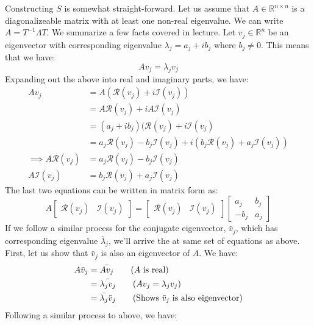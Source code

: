\documentclass[12pt]{exam}
\newcommand{\Q}[1]{\question{\large{\textbf{#1}}}}
\begin{document}
\begin{questions}
  \newpage
  \Q{Real modal form}
  \begin{solution}
    Constructing $S$ is somewhat straight-forward. Let us assume that $A \in \mathbb{R}^{n\times n}$ is a diagonalizeable matrix with at least one non-real eigenvalue. We can write $A = T^{-1}\Lambda T$. We summarize a few facts covered in lecture. Let $v_j \in \mathbb{R}^n$ be an eigenvector with corresponding eigenvalue $\lambda_j = a_j + i b_j$ where $b_j \neq 0$. This means that we have:
    \[
      Av_j = \lambda_j v_j
    \]
    Expanding out the above into real and imaginary parts, we have:
    \begin{align*}
      Av_j &= A(\mathcal{R}(v_j) + i \mathcal{I}(v_j)) \\
      &= A\mathcal{R}(v_j) + i A \mathcal{I}(v_j) \\
      &= (a_j + ib_j)(\mathcal{R}(v_j) + i \mathcal{I}(v_j) \\
      &=  a_j\mathcal{R}(v_j) - b_j\mathcal{I}(v_j) + i(b_j\mathcal{R}(v_j) + a_j\mathcal{I}(v_j)) \\ 
    \implies A\mathcal{R}(v_j) &=  a_j\mathcal{R}(v_j) - b_j\mathcal{I}(v_j) \\
    A\mathcal{I}(v_j) &= b_j\mathcal{R}(v_j) + a_j\mathcal{I}(v_j)
    \end{align*}
    The last two equations can be written in matrix form as:
    \[
      A\begin{bmatrix} \mathcal{R}(v_j) & \mathcal{I}(v_j)\end{bmatrix} = \begin{bmatrix} \mathcal{R}(v_j) & \mathcal{I}(v_j) \end{bmatrix} \begin{bmatrix}
        a_j & b_j \\
        -b_j & a_j
      \end{bmatrix}
    \]
    If we follow a similar process for the conjugate eigenvector, $\bar{v}_j$, which has corresponding eigenvalue $\bar{\lambda}_j$, we'll arrive the at same set of equations as above. First, let us show that $\bar{v}_j$ is also an eigenvector of $A$. We have:
    \begin{align*}
     A\bar{v}_j &= \bar{Av_j} \tag{$A$ is real} \\
     &= \bar{\lambda_j v_j} \tag{$Av_j = \lambda_j v_j$} \\
     &= \bar{\lambda_j} \bar{v}_j \tag{Shows $\bar{v}_j$ is also eigenvector}
    \end{align*}
    Following a similar process to above, we have:

\end{solution}
\end{questions}
\end{document}
